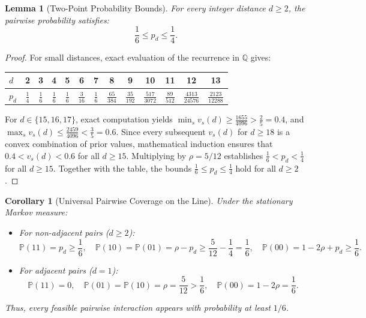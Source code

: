 \documentclass[11pt,a4paper]{article}
\newtheorem{lemma}[theorem]{Lemma}
\newtheorem{corollary}[theorem]{Corollary}
\theoremstyle{definition}
\theoremstyle{remark}
\begin{document}
\begin{lemma}[Two-Point Probability Bounds]
\label{lem:two_point}
For every integer distance $d \ge 2$, the pairwise probability satisfies:
\begin{equation}
    \frac{1}{6} \le p_d \le \frac{1}{4}.
\end{equation}
\end{lemma}

\begin{proof}
For small distances, exact evaluation of the recurrence in $\mathbb{Q}$ gives:
\begin{center}
\begin{tabular}{lcccccccccccc}
\toprule
$d$ & 2 & 3 & 4 & 5 & 6 & 7 & 8 & 9 & 10 & 11 & 12 & 13 \\
\midrule
$p_d$ & $\frac{1}{4}$ & $\frac{1}{6}$ & $\frac{1}{6}$ & $\frac{1}{6}$ & $\frac{3}{16}$ & $\frac{1}{6}$ & $\frac{65}{384}$ & $\frac{35}{192}$ & $\frac{517}{3072}$ & $\frac{89}{512}$ & $\frac{4313}{24576}$ & $\frac{2123}{12288}$ \\
\bottomrule
\end{tabular}
\end{center}
For $d \in \{15, 16, 17\}$, exact computation yields $\min_s v_s(d) \ge \frac{1655}{4096} > \frac{2}{5} = 0.4$, and $\max_s v_s(d) \le \frac{2459}{4096} < \frac{3}{5} = 0.6$.
Since every subsequent $v_s(d)$ for $d \ge 18$ is a convex combination of prior values, mathematical induction ensures that $0.4 < v_s(d) < 0.6$ for all $d \ge 15$.
Multiplying by $\rho = 5/12$ establishes $\frac{1}{6} < p_d < \frac{1}{4}$ for all $d \ge 15$.
Together with the table, the bounds $\frac{1}{6} \le p_d \le \frac{1}{4}$ hold for all $d \ge 2$.
\end{proof}

\begin{corollary}[Universal Pairwise Coverage on the Line]
\label{cor:pairwise_states}
Under the stationary Markov measure:
\begin{itemize}
    \item For non-adjacent pairs ($d \ge 2$):
    \[
        \mathbb{P}(11) = p_d \ge \frac{1}{6}, \quad \mathbb{P}(10) = \mathbb{P}(01) = \rho - p_d \ge \frac{5}{12} - \frac{1}{4} = \frac{1}{6}, \quad \mathbb{P}(00) = 1 - 2\rho + p_d \ge \frac{1}{6}.
    \]
    \item For adjacent pairs ($d = 1$):
    \[
        \mathbb{P}(11) = 0, \quad \mathbb{P}(01) = \mathbb{P}(10) = \rho = \frac{5}{12} > \frac{1}{6}, \quad \mathbb{P}(00) = 1 - 2\rho = \frac{1}{6}.
    \]
\end{itemize}
Thus, every feasible pairwise interaction appears with probability at least $1/6$.
\end{corollary}
\end{document}
